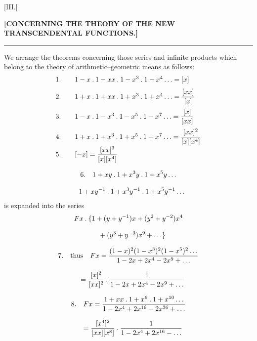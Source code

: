 \begingroup
\renewcommand{\arraystretch}{1.45}
\clearpage{}
\begin{center}
[III.]\par
\textbf{[CONCERNING THE THEORY OF THE NEW TRANSCENDENTAL FUNCTIONS.]}\par
\rule{13mm}{0.3pt}
\end{center}
We arrange the theorems concerning those series and infinite products which belong to the theory of arithmetic–geometric means as follows:
\[
\begin{array}{r@{\qquad}l}
1.&1-x\mathbin{.}1-xx\mathbin{.}1-x^3\mathbin{.}1-x^4\mathinner{.\,.\,.}=[x]\\[7pt]
2.&1+x\mathbin{.}1+xx\mathbin{.}1+x^3\mathbin{.}1+x^4\mathinner{.\,.\,.}=\dfrac{[xx]}{[x]}\\[11pt]
3.&1-x\mathbin{.}1-x^3\mathbin{.}1-x^5\mathbin{.}1-x^7\mathinner{.\,.\,.}=\dfrac{[x]}{[xx]}\\[11pt]
4.&1+x\mathbin{.}1+x^3\mathbin{.}1+x^5\mathbin{.}1+x^7\mathinner{.\,.\,.}=\dfrac{[xx]^2}{[x][x^4]}\\[7pt]
5.&[-x]=\dfrac{[xx]^3}{[x][x^4]}
\end{array}
\]

\[
\begin{gathered}6.\quad1+xy\mathbin{.}1+x^3y\mathbin{.}1+x^5y\mathinner{.\,.\,.}
\\[8pt]\quad{}1+xy^{-1}\mathbin{.}1+x^3y^{-1}\mathbin{.}1+x^5y^{-1}\mathinner{.\,.\,.}\end{gathered}
\]
is expanded into the series
\[
\begin{gathered}Fx\mathbin{.}\{1+(y+y^{-1})x+(y^2+y^{-2})x^4\\[8pt]\quad{}+(y^3+y^{-3})x^9+\mathinner{.\,.\,.}\}\end{gathered}
\]

\[
\begin{gathered}7.\quad\text{thus}\quad
Fx=\frac{(1-x)^2(1-x^3)^2(1-x^5)^2\mathinner{.\,.\,.}}
{1-2x+2x^4-2x^9+\mathinner{.\,.\,.}}
\\[8pt]\quad{}=\frac{[x]^2}{[xx]^2}\mathbin{.}
\frac{1}{1-2x+2x^4-2x^9+\mathinner{.\,.\,.}}\end{gathered}
\]

\[
\begin{gathered}8.\quad Fx=
\frac{1+xx\mathbin{.}1+x^6\mathbin{.}1+x^{10}\mathinner{.\,.\,.}}
{1-2x^4+2x^{16}-2x^{36}+\mathinner{.\,.\,.}}
\\[8pt]\quad{}=\frac{[x^4]^2}{[xx][x^8]}\mathbin{.}
\frac{1}{1-2x^4+2x^{16}-\mathinner{.\,.\,.}}\end{gathered}
\]

